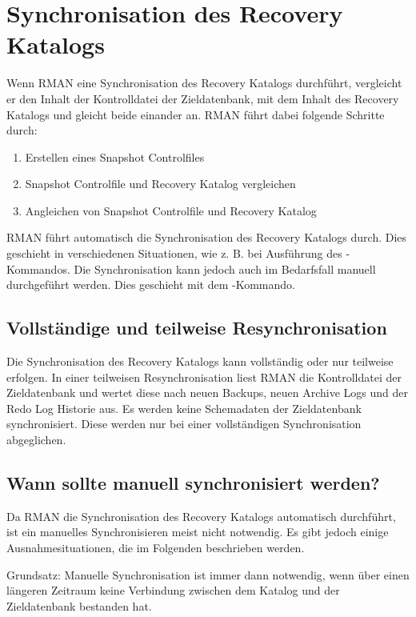    \section{Synchronisation des Recovery Katalogs}
      Wenn RMAN eine Synchronisation des Recovery Katalogs durchf\"uhrt, vergleicht er den Inhalt der Kontrolldatei der Zieldatenbank, mit dem Inhalt des Recovery Katalogs und gleicht beide einander an. RMAN f\"uhrt dabei folgende Schritte durch:
      \begin{enumerate}
        \item Erstellen eines Snapshot Controlfiles
        \item Snapshot Controlfile und Recovery Katalog vergleichen
        \item Angleichen von Snapshot Controlfile und Recovery Katalog
      \end{enumerate}
      RMAN f\"uhrt automatisch die Synchronisation des Recovery Katalogs durch. Dies geschieht in verschiedenen Situationen, wie z. B. bei Ausf\"uhrung des -Kommandos. Die Synchronisation kann jedoch auch im Bedarfsfall manuell durchgef\"uhrt werden. Dies geschieht mit dem -Kommando.
      \subsection{Vollst\"andige und teilweise Resynchronisation}
        Die Synchronisation des Recovery Katalogs kann vollst\"andig oder nur teilweise erfolgen. In einer teilweisen Resynchronisation liest RMAN die Kontrolldatei der Zieldatenbank und wertet diese nach neuen Backups, neuen Archive Logs und der Redo Log Historie aus. Es werden keine Schemadaten der Zieldatenbank synchronisiert. Diese werden nur bei einer vollst\"andigen Synchronisation abgeglichen.
      \subsection{Wann sollte manuell synchronisiert werden?}
        Da RMAN die Synchronisation des Recovery Katalogs automatisch durchf\"uhrt, ist ein manuelles Synchronisieren meist nicht notwendig. Es gibt jedoch einige Ausnahmesituationen, die im Folgenden beschrieben werden.
        \begin{merke}
          Grundsatz: Manuelle Synchronisation ist immer dann notwendig, wenn \"uber einen l\"angeren Zeitraum keine Verbindung zwischen dem Katalog und der Zieldatenbank bestanden hat.
        \end{merke}
